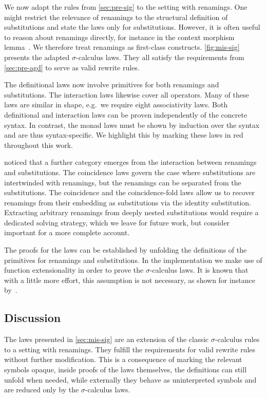 \documentclass[screen,nonacm]{acmart}
\begin{document}
We now adapt the rules from \cref{sec:pre-sig} to the setting with renamings.
One might restrict the relevance of renamings to the structural definition of
substitutions and state the laws only for substitutions. However, it is often
useful to reason about renamings directly, for instance in the context morphism
lemma~\cite{goguen1997candidates}. We therefore treat renamings as first-class
constructs. \cref{fig:mis-sig} presents the adapted $\sigma$-calculus laws.
They all satisfy the requirements from \cref{sec:pre-agd} to serve as valid
rewrite rules.

The definitional laws now involve primitives for both renamings and
substitutions. The interaction laws likewise cover all operators. Many of these
laws are similar in shape, e.g.\ we require eight associativity laws. Both
definitional and interaction laws can be proven independently of the concrete
syntax. In contrast, the monad laws must be shown by induction over the syntax
and are thus syntax-specific. We highlight this by marking these laws in red
throughout this work.

\citeauthor{10.1145/3293880.3294101} noticed that a further category emerges from the interaction between
renamings and substitutions. The coincidence laws govern the case where
substitutions are intertwinded with renamings, but the renamings can be
separated from the substitutions. The coincidence and the coincidence-fold laws
allow us to recover renamings from their embedding as substitutions via the
identity substitution. Extracting arbitrary renamings from deeply nested
substitutions would require a dedicated solving strategy, which we leave for
future work, but consider important for a more complete account.

The proofs for the laws can be established by unfolding the definitions of the
primitives for renamings and substitutions. In the implementation we make use
of function extensionality in order to prove the $\sigma$-calculus laws. It is
known that with a little more effort, this assumption is not necessary, as
shown for instance by~\citet{saffrich:LIPIcs.ITP.2024.32}.

\subsection{Discussion}\label{sec:mis-dis}
The laws presented in \cref{sec:mis-sig} are an extension of the classic
$\sigma$-calculus rules to a setting with renamings. They fulfill the
requirements for valid rewrite rules without further modification. This is a
consequence of marking the relevant symbols opaque, inside proofs of the laws
themselves, the definitions can still unfold when needed, while externally they
behave as uninterpreted symbols and are reduced only by the $\sigma$-calculus
laws.
\end{document}
